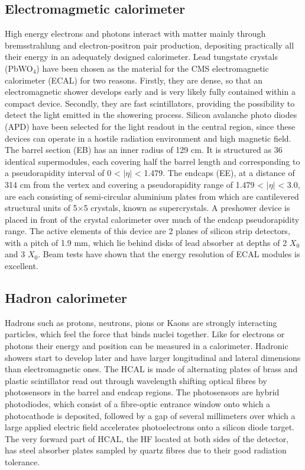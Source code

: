 \subsection{Electromagmetic calorimeter}
High energy electrons and photons interact with matter mainly through bremsstrahlung and electron-positron
pair production, depositing practically all their energy in an adequately designed calorimeter. Lead tungstate
crystals (PbWO$_{4}$) have been chosen as the material for the CMS electromagnetic calorimeter (ECAL) for two
reasons. Firstly, they are dense, so that an electromagnetic shower develops early and is very likely fully contained
within a compact device. Secondly, they are fast scintillators, providing the possibility to detect the light emitted
in the showering process. Silicon avalanche photo diodes (APD) have been selected for the light readout in the
central region, since these devices can operate in a hostile radiation environment and high magnetic field.
\newline The barrel section (EB) has an inner radius of 129 cm. It is structured as 36 identical supermodules,
each covering half the barrel length and corresponding to a pseudorapidity
interval of 0 < $|\eta|$ < 1.479. The endcaps (EE), at a distance of 314 cm from the vertex and covering a pseudorapidity
range of 1.479 < $|\eta|$ < 3.0, are each consisting of semi-circular aluminium
plates from which are cantilevered structural units of 5$\times$5 crystals, known as supercrystals. A preshower
device is placed in front of the crystal calorimeter over much of the endcap pseudorapidity
range. The active elements of this device are 2 planes of silicon strip detectors, with a pitch
of 1.9 mm, which lie behind disks of lead absorber at depths of 2 $X_{0}$ and 3 $X_{0}$.
Beam tests have shown that the energy resolution of ECAL modules is excellent.

\subsection{Hadron calorimeter}
Hadrons such as protons, neutrons, pions or Kaons are strongly interacting particles, which feel the force that
binds nuclei together. Like for electrons or photons their energy and position can be measured in a calorimeter.
Hadronic showers start to develop later and have larger longitudinal and lateral dimensions than electromagnetic
ones. The HCAL is made of alternating plates of brass and plastic scintillator read out through wavelength shifting optical fibres by
photosensors in the barrel and endcap regions. The photosensors are hybrid photodiodes, which consist of a fibre-optic entrance window onto which a photocathode is deposited, followed by a gap of several millimeters over which a large applied electric field accelerates photoelectrons onto a silicon diode target. The very forward
part of HCAL, the HF located at both sides of the detector, has steel absorber plates sampled by quartz fibres due to their good radiation tolerance.

